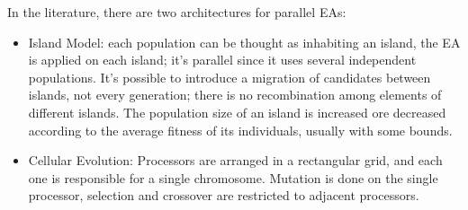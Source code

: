 In the literature, there are two architectures for parallel EAs:
\begin{itemize}
	\item Island Model: each population can be thought as inhabiting an island, the EA is applied on each island; it's parallel since it uses several independent populations. It's possible to introduce a migration of candidates between islands, not every generation; there is no recombination among elements of different islands. The population size of an island is increased ore decreased according to the average fitness of its individuals, usually with some bounds.
	\item Cellular Evolution: Processors are arranged in a rectangular grid, and each one is responsible for a single chromosome. Mutation is done on the single processor, selection and crossover are restricted to adjacent processors.
\end{itemize}